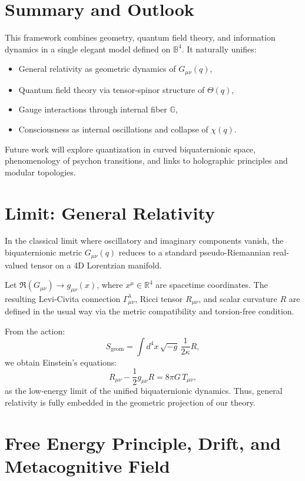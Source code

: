 \documentclass[12pt]{article}
\begin{document}
\section{Summary and Outlook}

This framework combines geometry, quantum field theory, and information dynamics in a single elegant model defined on \( \mathbb{B}^4 \). It naturally unifies:

\begin{itemize}
  \item General relativity as geometric dynamics of \( G_{\mu\nu}(q) \),
  \item Quantum field theory via tensor-spinor structure of \( \Theta(q) \),
  \item Gauge interactions through internal fiber \( \mathbb{G} \),
  \item Consciousness as internal oscillations and collapse of \( \chi(q) \).
\end{itemize}

Future work will explore quantization in curved biquaternionic space, phenomenology of psychon transitions, and links to holographic principles and modular topologies.

\section{Limit: General Relativity}

In the classical limit where oscillatory and imaginary components vanish, the biquaternionic metric \( G_{\mu\nu}(q) \) reduces to a standard pseudo-Riemannian real-valued tensor on a 4D Lorentzian manifold.

Let \( \Re(G_{\mu\nu}) \rightarrow g_{\mu\nu}(x) \), where \( x^\mu \in \mathbb{R}^4 \) are spacetime coordinates. The resulting Levi-Civita connection \( \Gamma^\lambda_{\mu\nu} \), Ricci tensor \( R_{\mu\nu} \), and scalar curvature \( R \) are defined in the usual way via the metric compatibility and torsion-free condition.

From the action:
\[
S_\text{geom} = \int d^4 x \, \sqrt{-g} \, \frac{1}{2\kappa} R,
\]
we obtain Einstein’s equations:
\[
R_{\mu\nu} - \frac{1}{2} g_{\mu\nu} R = 8 \pi G \, T_{\mu\nu},
\]
as the low-energy limit of the unified biquaternionic dynamics. Thus, general relativity is fully embedded in the geometric projection of our theory.


\section{Free Energy Principle, Drift, and Metacognitive Field}
\end{document}
